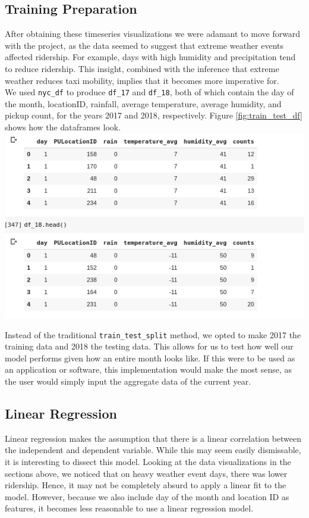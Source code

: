 \documentclass[journal, 12pt]{IEEEtran}
\newcommand{\cc}[1]{\texttt{#1}}
\begin{document}
\subsection{Training Preparation}

\noindent After obtaining these timeseries visualizations we were adamant to move forward with the project, as the data seemed to suggest that extreme weather events affected ridership. For example, days with high humidity and precipitation tend to reduce ridership. This insight, combined with the inference that extreme weather reduces taxi mobility, implies that it becomes more imperative for.\\

\noindent We used \cc{nyc\_df} to produce \cc{df\_17} and \cc{df\_18}, both of which contain the day of the month, locationID, rainfall, average temperature, average humidity, and pickup count, for the years 2017 and 2018, respectively. Figure \ref{fig:train_test_df} shows how the dataframes look. \\

\begingroup
    \centering
    \includegraphics[width=0.5\columnwidth]{report/images/train_test_df.png}
    \label{fig:train_test_df}
    \medskip
\endgroup

\noindent Instead of the traditional \cc{train\_test\_split} method, we opted to make 2017 the training data and 2018 the testing data. This allows for us to test how well our model performs given how an entire month looks like. If this were to be used as an application or software, this implementation would make the most sense, as the user would simply input the aggregate data of the current year.

\subsection{Linear Regression}

\noindent Linear regression makes the assumption that there is a linear correlation between the independent and dependent variable. While this may seem easily dismissable, it is interesting to dissect this model. Looking at the data visualizations in the sections above, we noticed that on heavy weather event days, there was lower ridership. Hence, it may not be completely absurd to apply a linear fit to the model. However, because we also include day of the month and location ID as features, it becomes less reasonable to use a linear regression model.\\
\end{document}
